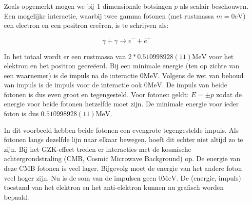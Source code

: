Zoals opgemerkt mogen we bij 1 dimensionale botsingen $p$ als scalair
beschouwen. Een mogelijke interactie, waarbij twee gamma fotonen (met
rustmassa $m=0\mathrm{eV}$) een electron en een positron cre\"eren,
is te schrijven als:

\begin{equation}
\gamma+\gamma\rightarrow e^{-}+\bar{e}^{+}
\end{equation}

In het totaal wordt er een rustmassa van $2*0.510998928(11)\mathrm{MeV}$
voor het elektron en het positron gecre\"eerd. Bij een minimale energie
(ten op zichte van een waarnemer) is de impuls na de interactie $0\mathrm{MeV}$.
Volgens de wet van behoud van impuls is de impuls voor de interactie
ook $0\mathrm{MeV}$. De impuls van beide fotonen is dus even groot
en tegengesteld. Voor fotonen geldt: $E=\pm p$ zodat de energie voor
beide fotonen hetzelfde moet zijn. De minimale energie voor ieder
foton is dus $0.510998928(11)\mathrm{MeV}$.

In dit voorbeeld hebben beide fotonen een evengrote tegengestelde
impuls. Als fotonen langs dezelfde lijn naar elkaar bewegen, hoeft
dit echter niet altijd zo te zijn. Bij het GZK-effect treden er interacties
met de kosmische achtergrondstraling (CMB, Cosmic Microwave Background)
op. De energie van deze CMB fotonen is veel lager. Bijgevolg moet
de energie van het andere foton veel hoger zijn. Nu is de som van
de impulsen geen $0\mathrm{MeV}$. De (energie, impuls) toestand van het
elektron en het anti-elektron kunnen nu grafisch worden bepaald.

